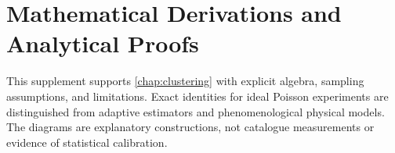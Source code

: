 
\providecommand{\bm}[1]{\mathbf{#1}}
\providecommand{\coloneqq}{\mathrel{\mathop:}=}
\providecommand{\mathds}[1]{\mathbb{#1}}
\providecommand{\pak}{\textsc{PAk}}
\providecommand{\kstar}{k^{*}}
\providecommand{\xvec}{\bm{x}}
\providecommand{\mdl}{\mathrm{MDL}}
\providecommand{\Zscore}{Z}
\providecommand{\etas}{\textsc{etas}}

\section*{Mathematical Derivations and Analytical Proofs}
\label{sec:supp_clustering}

This supplement supports \cref{chap:clustering} with explicit algebra,
sampling assumptions, and limitations. Exact identities for ideal Poisson
experiments are distinguished from adaptive estimators and phenomenological
physical models. The diagrams are explanatory constructions, not catalogue
measurements or evidence of statistical calibration.



